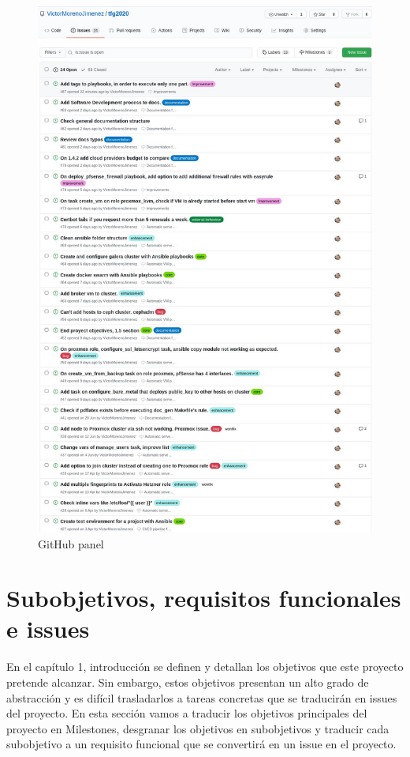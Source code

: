 \begin{text}
	\begin{figure}[!hbt]
		\centering
		\includegraphics[scale=0.44]{imagenes/Analisis/githubissues.jpg}
		\caption[GitHub panel]{GitHub panel}
		\label{github_issues}
	\end{figure}
\end{text}
\clearpage

\section{Subobjetivos, requisitos funcionales e issues}
	\begin{text}
		En el capítulo 1, introducción se definen y detallan los objetivos que este proyecto pretende alcanzar. Sin embargo, estos objetivos presentan un alto grado de abstracción y es difícil trasladarlos a tareas concretas que se traducirán en issues del proyecto. En esta sección vamos a traducir los objetivos principales del proyecto en Milestones, desgranar los objetivos en subobjetivos y traducir cada subobjetivo a un requisito funcional que se convertirá en un issue en el proyecto.
	\end{text}

